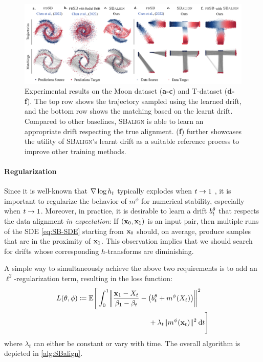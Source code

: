 \begin{figure}[t]
    \centering
    \includegraphics[width=\textwidth]{figures/fig_results_synthetic.pdf}
    \caption{Experimental results on the Moon dataset (\textbf{a-c}) and T-dataset (\textbf{d-f}). The top row shows the trajectory sampled using the learned drift, and the bottom row shows the matching based on the learnt drift. Compared to other baselines, \textsc{SBalign} is able to learn an appropriate drift respecting the true alignment. (\textbf{f}) further showcases the utility of \textsc{SBalign}'s learnt drift as a suitable reference process to improve other training methods.}
    \label{fig:results_spiral}
\end{figure}

\paragraph{Regularization}
Since it is well-known that $\nabla \log h_t$ typically explodes when $t\to 1$ \citep{liu2023learning}, it is important to regularize the behavior of $m^{\phi}$ for numerical stability, especially when $t\to 1$. Moreover, in practice, it is desirable to learn a drift $b_t^\theta$ that respects the data alignment \emph{in expectation}: If $(\mathbf{x}_0,\mathbf{x}_1)$ is an input pair, then multiple runs of the \acrshort{SDE} \eqref{eq:SB-SDE} starting from $\mathbf{x}_0$ should, on average, produce samples that are in the proximity of $\mathbf{x}_1$. This observation implies that we should search for drifts whose corresponding $h$-transforms are diminishing.

A simple way to simultaneously achieve the above two requirements is to add an $\ell^2$-regularization term, resulting in the loss function:
\begin{align}
\label{eq:loss_final}
\Loss(\theta,\phi) &\defeq \mathbb{E} \Bigg[\int_0^1 \norm*{\frac{\x_1-X_t}{\cvolat[\horizon]-\cvolat[\ctime]}- \left(\fdrift^\theta + m^{\phi}(X_t)\right)}^2
\\ &\hspace{35mm}+ \lambda_t \norm{m^{\phi}(\x_t)}^2 \dt \Bigg]
\nonumber
\end{align}where $\lambda_t$ can either be constant or vary with time. The overall algorithm is depicted in \cref{alg:SBalign}.


